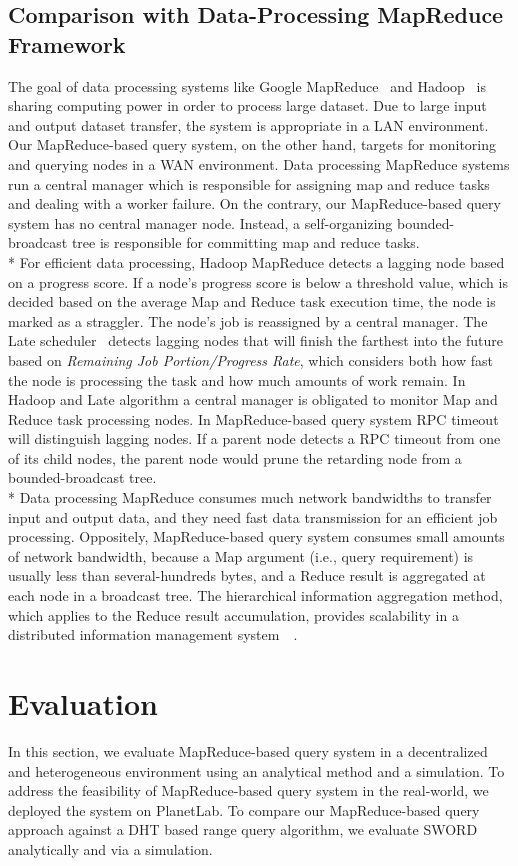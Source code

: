 \documentclass{acm_proc_article-sp}
\begin{document}
\subsection{Comparison with Data-Processing MapReduce Framework}
The goal of data processing systems like Google MapReduce~\cite{google_mapreduce} and Hadoop~\cite{hadoop} is sharing computing power in order to process large dataset. 
Due to large input and output dataset transfer, the system is appropriate in a LAN environment.
Our MapReduce-based query system, on the other hand, targets for monitoring and querying nodes in a WAN environment.
Data processing MapReduce systems run a central manager which is responsible for assigning map and reduce tasks and dealing with a  worker failure.
On the contrary, our MapReduce-based query system has no central manager node. Instead, a self-organizing bounded-broadcast tree is responsible for committing map and reduce tasks.\\*
For efficient data processing, Hadoop MapReduce detects a lagging node based on a progress score.
If a node's progress score is below a threshold value, which is decided based on the average Map and Reduce task execution time, the node is marked as a straggler. The node's job is reassigned by a central manager.
The Late scheduler~\cite{late} detects lagging nodes that will finish the farthest into the future based on \textit{Remaining Job Portion/Progress Rate}, which considers both
how fast the node is processing the task and how much amounts of work remain. 
In Hadoop and Late algorithm a central manager is obligated to monitor Map and Reduce task processing nodes. 
In MapReduce-based query system RPC timeout will distinguish lagging nodes. If a parent node detects a RPC timeout from one of its child nodes, the parent node would prune the retarding node from a bounded-broadcast tree.\\*
Data processing MapReduce consumes much network bandwidths to transfer input and output data, and they need fast data transmission for an efficient job processing. 
Oppositely, MapReduce-based query system consumes small amounts of network bandwidth, because a Map argument (i.e., query requirement) is usually less than several-hundreds bytes, and a Reduce result is aggregated at each node in a broadcast tree.
The hierarchical information aggregation method, which applies to the Reduce result accumulation, provides scalability in a distributed information management system~\cite{astrobe}~\cite{treedatamanage}.
\section{Evaluation}
In this section, we evaluate MapReduce-based query system in a decentralized and heterogeneous environment using an analytical method and a simulation. 
To address the feasibility of MapReduce-based query system in the real-world, we deployed the system on PlanetLab. 
To compare our MapReduce-based query approach against a DHT based range query algorithm, we evaluate SWORD~\cite{sword} analytically and via a simulation.
\end{document}
